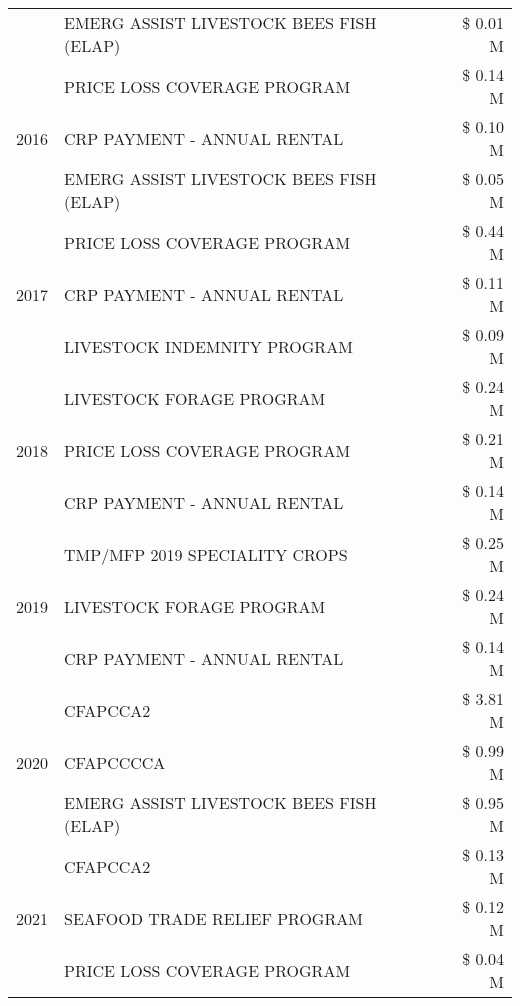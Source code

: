 \begin{tabular}{llr}
 & EMERG ASSIST LIVESTOCK BEES FISH (ELAP) & \$ 0.01 M \\
\cline{1-3}
\multirow[t]{3}{*}{2016} & PRICE LOSS COVERAGE PROGRAM & \$ 0.14 M \\
 & CRP PAYMENT - ANNUAL RENTAL & \$ 0.10 M \\
 & EMERG ASSIST LIVESTOCK BEES FISH (ELAP) & \$ 0.05 M \\
\cline{1-3}
\multirow[t]{3}{*}{2017} & PRICE LOSS COVERAGE PROGRAM & \$ 0.44 M \\
 & CRP PAYMENT - ANNUAL RENTAL & \$ 0.11 M \\
 & LIVESTOCK INDEMNITY PROGRAM & \$ 0.09 M \\
\cline{1-3}
\multirow[t]{3}{*}{2018} & LIVESTOCK FORAGE PROGRAM & \$ 0.24 M \\
 & PRICE LOSS COVERAGE PROGRAM & \$ 0.21 M \\
 & CRP PAYMENT - ANNUAL RENTAL & \$ 0.14 M \\
\cline{1-3}
\multirow[t]{3}{*}{2019} & TMP/MFP 2019 SPECIALITY CROPS & \$ 0.25 M \\
 & LIVESTOCK FORAGE PROGRAM & \$ 0.24 M \\
 & CRP PAYMENT - ANNUAL RENTAL & \$ 0.14 M \\
\cline{1-3}
\multirow[t]{3}{*}{2020} & CFAPCCA2 & \$ 3.81 M \\
 & CFAPCCCCA & \$ 0.99 M \\
 & EMERG ASSIST LIVESTOCK BEES FISH (ELAP) & \$ 0.95 M \\
\cline{1-3}
\multirow[t]{3}{*}{2021} & CFAPCCA2 & \$ 0.13 M \\
 & SEAFOOD TRADE RELIEF PROGRAM & \$ 0.12 M \\
 & PRICE LOSS COVERAGE PROGRAM & \$ 0.04 M \\
\cline{1-3}
\bottomrule
\end{tabular}
